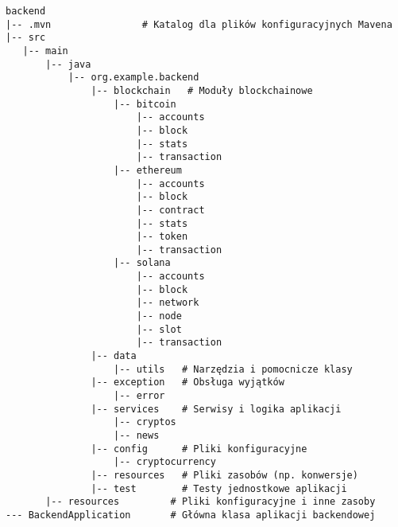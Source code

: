 \begin{verbatim}
backend
|-- .mvn                # Katalog dla plików konfiguracyjnych Mavena
|-- src
   |-- main
       |-- java
           |-- org.example.backend
               |-- blockchain   # Moduły blockchainowe
                   |-- bitcoin
                       |-- accounts
                       |-- block
                       |-- stats
                       |-- transaction
                   |-- ethereum
                       |-- accounts
                       |-- block
                       |-- contract
                       |-- stats
                       |-- token
                       |-- transaction
                   |-- solana
                       |-- accounts
                       |-- block
                       |-- network
                       |-- node
                       |-- slot
                       |-- transaction
               |-- data
                   |-- utils   # Narzędzia i pomocnicze klasy
               |-- exception   # Obsługa wyjątków
                   |-- error
               |-- services    # Serwisy i logika aplikacji
                   |-- cryptos
                   |-- news
               |-- config      # Pliki konfiguracyjne
                   |-- cryptocurrency
               |-- resources   # Pliki zasobów (np. konwersje)
               |-- test        # Testy jednostkowe aplikacji
       |-- resources         # Pliki konfiguracyjne i inne zasoby
--- BackendApplication       # Główna klasa aplikacji backendowej
\end{verbatim}